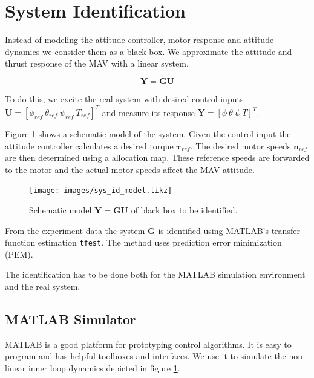 \section{System Identification}
\label{sec:sys_id}
Instead of modeling the attitude controller, motor response and attitude dynamics we consider them as a black box. We approximate the attitude and thrust response of the MAV with a linear system.

\begin{equation}
\mathbf{Y} = \mathbf{G} \mathbf{U}
\end{equation}

To do this, we excite the real system with desired control inputs $\mathbf{U} = \left[\phi_{ref} ~ \theta_{ref} ~ \psi_{ref} ~ T_{ref} \right]^T$ and measure its response $\mathbf{Y} = \left[\phi ~ \theta ~ \psi ~ T \right]^T$. 

Figure \ref{pics:sys_id_model} shows a schematic model of the system. Given the control input the attitude controller calculates a desired torque $\boldsymbol{\tau}_{ref}$. The desired motor speeds $\mathbf{n}_{ref}$ are then determined using a allocation map. These reference speeds are forwarded to the motor and the actual motor speeds affect the MAV attitude.

\begin{figure}
\centering
\texttt{[image: images/sys\_id\_model.tikz]}
\caption{Schematic model $\mathbf{Y} = \mathbf{G} \mathbf{U}$ of black box to be identified.}
\label{pics:sys_id_model}
\end{figure}

From the experiment data the system $\mathbf{G}$ is identified using MATLAB's transfer function estimation \texttt{tfest}. The method uses prediction error minimization (PEM).

The identification has to be done both for the MATLAB simulation environment and the real system.

\subsection{MATLAB Simulator}
\label{sec:matlab_simulator}
MATLAB is a good platform for prototyping control algorithms. It is easy to program and has helpful toolboxes and interfaces. We use it to simulate the non-linear inner loop dynamics depicted in figure \ref{pics:sys_id_model}.

